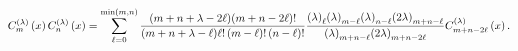 \[C^{(\lambda)}_{m}\left(x\right)C^{(\lambda)}_{n}\left(x\right)=\sum_{\ell=0}^{%
\min(m,n)}\frac{(m+n+\lambda-2\ell)(m+n-2\ell)!}{(m+n+\lambda-\ell)\ell!\,(m-%
\ell)!\,(n-\ell)!}\*\frac{{\left(\lambda\right)_{\ell}}{\left(\lambda\right)_{%
m-\ell}}{\left(\lambda\right)_{n-\ell}}{\left(2\lambda\right)_{m+n-\ell}}}{{%
\left(\lambda\right)_{m+n-\ell}}{\left(2\lambda\right)_{m+n-2\ell}}}C^{(%
\lambda)}_{m+n-2\ell}\left(x\right).\]